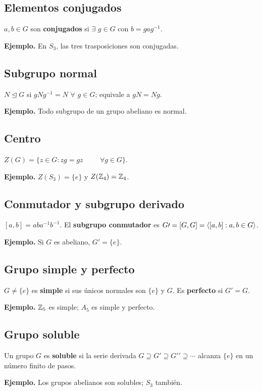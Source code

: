 \documentclass[11pt,a4paper]{article}
\begin{document}
\subsection{Elementos conjugados}
\begin{definicion}
$a,b\in G$ son \textbf{conjugados} si $\exists$ $g\in G$ con $b=gag^{-1}$.
\end{definicion}
\textbf{Ejemplo.} En $S_3$, las tres trasposiciones son conjugadas.


\subsection{Subgrupo normal}
\begin{definicion}
$N\trianglelefteq G$ si $gNg^{-1}=N$ $\forall$ $g\in G$; equivale a $gN=Ng$.
\end{definicion}
\textbf{Ejemplo.} Todo subgrupo de un grupo abeliano es normal.


\subsection{Centro}
\begin{definicion}
$Z(G)=\{z\in G:zg=gz \hspace{1cm} \forall g\in G\}$.
\end{definicion}
\textbf{Ejemplo.} $Z(S_3)=\{e\}$ y $Z(\mathbb{Z}_4)=\mathbb{Z}_4$.


\subsection{Conmutador y subgrupo derivado}
\begin{definicion}
$[a,b]=aba^{-1}b^{-1}$. El \textbf{subgrupo conmutador} es $G\prime=[G,G]=\langle [a,b]:a,b\in G\rangle$.
\end{definicion}
\textbf{Ejemplo.} Si $G$ es abeliano, $G\prime=\{e\}$.


\subsection{Grupo simple y perfecto}
\begin{definicion}
$G\ne\{e\}$ es \textbf{simple} si sus únicos normales son $\{e\}$ y $G$. Es \textbf{perfecto} si $G\prime=G$.
\end{definicion}
\textbf{Ejemplo.} $\mathbb{Z}_5$ es simple; $A_5$ es simple y perfecto.


\subsection{Grupo soluble}
\begin{definicion}
Un grupo $G$ es \textbf{soluble} si la serie derivada $G\supseteq G\prime\supseteq G\prime\prime\supseteq\cdots$ alcanza $\{e\}$ en un número finito de pasos.
\end{definicion}
\textbf{Ejemplo.} Los grupos abelianos son solubles; $S_3$ también.
\end{document}
